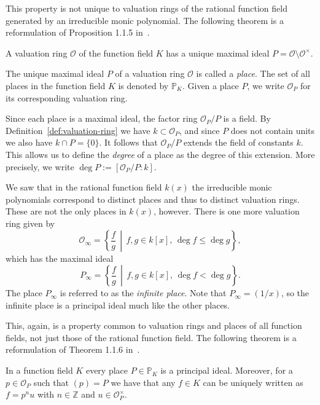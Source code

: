 This property is not unique to valuation rings of the rational function field generated by an irreducible monic polynomial. The following theorem is a reformulation of Proposition 1.1.5 in~\cite{stichtenoth-2009-algebraic-function-fields}.

\begin{theorem}%
  \label{thm:place-is-maximal-ideal}
  A valuation ring \(\mathcal{O}\) of the function field \(K\) has a unique maximal ideal \(P = \mathcal{O} \setminus \mathcal{O}^{\times}\).
\end{theorem}

The unique maximal ideal \(P\) of a valuation ring \(\mathcal{O}\) is called a \textit{place}. The set of all places in the function field \(K\) is denoted by \(\mathbb{P}_{K}\). Given a place \(P\), we write \(\mathcal{O}_{P}\) for its corresponding valuation ring.

Since each place is a maximal ideal, the factor ring \(\mathcal{O}_{P} / P\) is a field. By Definition~\ref{def:valuation-ring} we have \(k \subset \mathcal{O}_{P}\), and since \(P\) does not contain units we also have \(k \cap P = \{0\}\). It follows that \(\mathcal{O}_{P} / P\) extends the field of constants \(k\). This allows us to define the \textit{degree} of a place as the degree of this extension. More precisely, we write \(\deg{P} := [\mathcal{O}_{P} / P : k]\).

We saw that in the rational function field \(k(x)\) the irreducible monic polynomials correspond to distinct places and thus to distinct valuation rings. These are not the only places in \(k(x)\), however. There is one more valuation ring given by
\[\mathcal{O}_{\infty} = \left\{ \frac{f}{g} \,\middle|\, f,g \in k[x] ,\, \deg{f} \leq \deg{g} \right\},\]
which has the maximal ideal
\[P_{\infty} = \left\{ \frac{f}{g} \,\middle|\, f,g \in k[x] ,\, \deg{f} < \deg{g} \right\}.\]
The place \(P_{\infty}\) is referred to as the \textit{infinite place}. Note that \(P_{\infty} = (1/x)\), so the infinite place is a principal ideal much like the other places.

This, again, is a property common to valuation rings and places of all function fields, not just those of the rational function field. The following theorem is a reformulation of Theorem 1.1.6 in~\cite{stichtenoth-2009-algebraic-function-fields}.

\begin{theorem}%
  \label{thm:place-is-principal-ideal}
  In a function field \(K\) every place \(P \in \mathbb{P}_{K}\) is a principal ideal. Moreover, for a \(p \in \mathcal{O}_{P}\) such that \((p) = P\) we have that any \(f \in K\) can be uniquely written as \(f = p^{n}u\) with \(n \in \mathbb{Z}\) and \(u \in \mathcal{O}_{P}^{\times}\).
\end{theorem}


